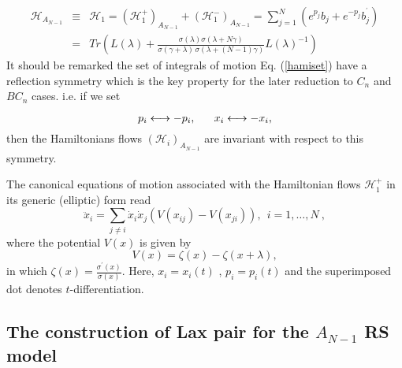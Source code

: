 \documentclass[a4paper,12pt]{article}
\begin{document}
\begin{eqnarray}
\mathcal{H}_{A_{N-1}} &\equiv &\mathcal{H}_{1}=(\mathcal{H}
_{1}^{+})_{A_{N-1}}+(\mathcal{H}_{1}^{-})_{A_{N-1}}=
\sum_{j=1}^{N}(e^{p_{j}}b_{j}+e^{-p_{j}}b_{j}^{^{\prime }})  \nonumber \\
&=&Tr(L(\lambda )+\frac{\sigma (\lambda )\sigma (\lambda
+N\gamma )}{\sigma (\gamma +\lambda )\,\sigma (\lambda
+(N-1)\gamma )}L(\lambda )^{-1})
\end{eqnarray}
It should be remarked the set of integrals of motion Eq.
(\ref{hamiset}) have a reflection symmetry which is the key
property for the later reduction to $C_{n}$ and $BC_{n}$
cases. i.e. if we set

\begin{equation}
p_{i}\longleftrightarrow -p_{i},\mbox{$ \ \ \ \ \
$}x_{i}\longleftrightarrow
-x_{i},	 \label{sym}
\end{equation}
then the Hamiltonians flows $(\mathcal{H}_{i})_{A_{N-1}}$
are invariant with respect to this symmetry.

The canonical equations of motion associated with the
Hamiltonian flows $
\mathcal{H}_{1}^{+}$  in its generic (elliptic) form
read
\begin{equation}
\ddot{x}_{i}=\sum_{j\neq i}\dot{x}_{i}\dot{x}_{j}(V(x_{ij})-V(x_{ji})),\ \
i=1,\ldots ,N\ ,
\end{equation}
where the potential $V(x)$ is given by
\begin{equation}
V(x)=\zeta (x)-\zeta (x+\lambda ),
\end{equation}
in which $\zeta (x)=\frac{\sigma ^{\prime }(x)}{\sigma
(x)}$. Here, $x_{i}=x_{i}(t)$ ,
$p_{i}=p_{i}(t)$ and the superimposed dot denotes
$t$-differentiation.

\subsection{The construction of Lax pair for the $A_{N-1}$ RS model}
\end{document}
